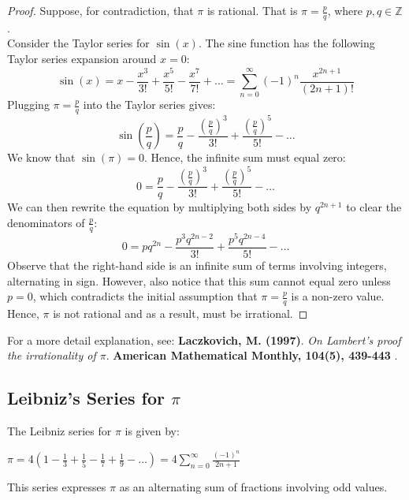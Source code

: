 \documentclass[12pt]{article}
\begin{document}
\begin{proof}
Suppose, for contradiction, that $\pi$ is rational. That is $\pi = \frac{p}{q}$, where $p, q \in \mathbb{Z}$.\\

\noindent Consider the Taylor series for $\sin(x)$. The sine function has the following Taylor series expansion around $x = 0$:
\begin{equation}
    \sin(x) = x - \frac{x^3}{3!} + \frac{x^5}{5!} - \frac{x^7}{7!} + \ldots = \sum_{n=0}^\infty (-1)^n \frac{x^{2n+1}}{(2n+1)!}
\end{equation}
Plugging $\pi = \frac{p}{q}$ into the Taylor series gives:
\begin{equation}
    \sin\left(\frac{p}{q}\right) = \frac{p}{q} - \frac{\left(\frac{p}{q}\right)^3}{3!} + \frac{\left(\frac{p}{q}\right)^5}{5!} - \ldots
\end{equation}
We know that $\sin(\pi) = 0$. Hence, the infinite sum must equal zero:
\begin{equation}
    0 = \frac{p}{q} - \frac{\left(\frac{p}{q}\right)^3}{3!} + \frac{\left(\frac{p}{q}\right)^5}{5!} - \ldots
\end{equation}
We can then rewrite the equation by multiplying both sides by $q^{2n+1}$ to clear the denominators of $\frac{p}{q}$:
\begin{equation}
    0 = pq^{2n} - \frac{p^3q^{2n-2}}{3!} + \frac{p^5q^{2n-4}}{5!} - \ldots
\end{equation}
Observe that the right-hand side is an infinite sum of terms involving integers, alternating in sign. However, also notice that this sum cannot equal zero unless $p = 0$, which contradicts the initial assumption that $\pi = \frac{p}{q}$ is a non-zero value.\\

\noindent Hence, $\pi$ is not rational and as a result, must be irrational.

\end{proof}

\noindent For a more detail explanation, see: 
\textbf{Laczkovich, M. (1997)}. \textit{On Lambert's proof the irrationality of $\pi$}. \textbf{American Mathematical Monthly, 104(5), 439-443} \cite{Laczkovich1997}.

\subsection{Leibniz's Series for $\pi$}\label{appendix:4}

The Leibniz series for $\pi$ is given by:
\begin{center}
    $\pi = 4 \left(1 - \frac{1}{3} + \frac{1}{5} - \frac{1}{7} + \frac{1}{9} - \ldots\right) = 4
    \sum\limits_{n=0}^\infty \frac{(-1)^n}{2n + 1}$
\end{center}
This series expresses $\pi$ as an alternating sum of fractions involving odd values.\\
\end{document}
